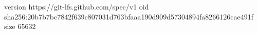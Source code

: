 version https://git-lfs.github.com/spec/v1
oid sha256:20b7b7bc7842f639c807031d763bfaaa190d909d57304894fa8266126cae491f
size 65632
